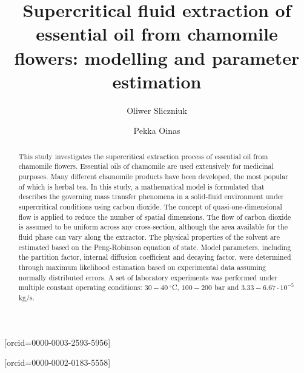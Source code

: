 \documentclass[a4paper,fleqn]{cas-dc}
\begin{document}
 

\title[mode=title]{Supercritical fluid extraction of essential oil from chamomile flowers: modelling and parameter estimation}                      


\author[1]{Oliwer Sliczniuk}[orcid=0000-0003-2593-5956]
\cormark[1]

\author[1]{Pekka Oinas}[orcid=0000-0002-0183-5558]

\address[1]{Aalto University, School of Chemical Engineering, Espoo, 02150, Finland}


\begin{abstract}
This study investigates the supercritical extraction process of essential oil from chamomile flowers. Essential oils of chamomile are used extensively for medicinal purposes. Many different chamomile products have been developed, the most popular of which is herbal tea. In this study, a mathematical model is formulated that describes the governing mass transfer phenomena in a solid-fluid environment under supercritical conditions using carbon dioxide. The concept of quasi-one-dimensional flow is applied to reduce the number of spatial dimensions. The flow of carbon dioxide is assumed to be uniform across any cross-section, although the area available for the fluid phase can vary along the extractor. The physical properties of the solvent are estimated based on the Peng-Robinson equation of state. Model parameters, including the partition factor, internal diffusion coefficient and decaying factor, were determined through maximum likelihood estimation based on experimental data assuming normally distributed errors. A set of laboratory experiments was performed under multiple constant operating conditions: $30-40~^\circ$C, $100-200$ bar and $3.33-6.67 \cdot 10^{-5}$ kg/s.


\end{abstract}
\end{document}
